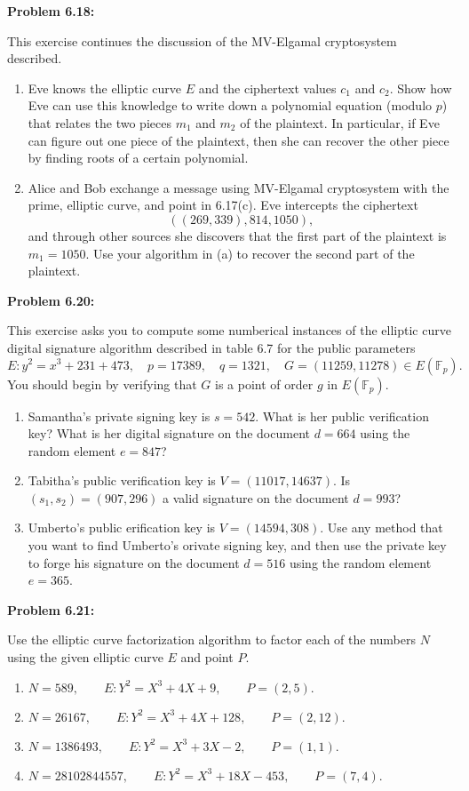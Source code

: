 \documentclass[a4paper, 11pt]{article}
\begin{document}
\noindent\textbf{Problem 6.18:}
    
    This exercise continues the discussion of the MV-Elgamal cryptosystem described.
    \begin{enumerate}[label=(\alph*)]
        \item Eve knows the elliptic curve $E$ and the ciphertext values $c_1$ and $c_2$. Show how Eve can use this knowledge to write down a polynomial equation (modulo $p$) that relates the two pieces $m_1$ and $m_2$ of the plaintext. In particular, if Eve can figure out one piece of the plaintext, then she can recover the other piece by finding roots of a certain polynomial.
        \item Alice and Bob exchange a message using MV-Elgamal cryptosystem with the prime, elliptic curve, and point in 6.17(c). Eve intercepts the ciphertext 
        $$((269,339),814,1050),$$
        and through other sources she discovers that the first part of the plaintext is $m_1=1050$. Use your algorithm in (a) to recover the second part of the plaintext.
    \end{enumerate}
    
\noindent\textbf{Problem 6.20:}
    
    This exercise asks you to compute some numberical instances of the elliptic curve digital signature algorithm described in table 6.7 for the public parameters $$E:y^2=x^3+231+473, \quad p=17389, \quad q=1321, \quad G=(11259,11278)\in E(\mathbb{F}_p).$$
    You should begin by verifying that $G$ is a point of order $g$ in $E(\mathbb{F}_p).$
    \begin{enumerate}[label=(\alph*)]
        \item Samantha's private signing key is $s=542$. What is her public verification key? What is her digital signature on the document $d=664$ using the random element $e=847$?
        \item Tabitha's public verification key is $V=(11017,14637).$ Is $(s_1,s_2)=(907,296)$ a valid signature on the document $d=993$?
        \item Umberto's public erification key is $V=(14594,308).$ Use any method that you want to find Umberto's orivate signing key, and then use the private key to forge his signature on the document $d=516$ using the random element $e=365$.
    \end{enumerate}
    
\noindent\textbf{Problem 6.21:}
    
    Use the elliptic curve factorization algorithm to factor each of the numbers $N$ using the given elliptic curve $E$ and point $P$.
    \begin{enumerate}[label=(\alph*)]
        \item $N=589, \qquad E:Y^2=X^3+4X+9, \qquad P=(2,5).$
        \item $N=26167, \qquad E:Y^2=X^3+4X+128, \qquad P=(2,12).$
        \item $N=1386493, \qquad E:Y^2=X^3+3X-2, \qquad P=(1,1).$
        \item $N=28102844557, \qquad E:Y^2=X^3+18X-453, \qquad P=(7,4).$
    \end{enumerate}
    
\end{document}
